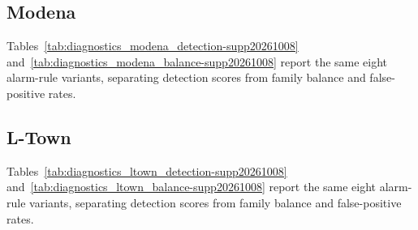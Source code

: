 \clearpage
\subsection{Modena}

Tables~\ref{tab:diagnostics_modena_detection-supp20261008} and~\ref{tab:diagnostics_modena_balance-supp20261008} report the same eight alarm-rule variants, separating detection scores from family balance and false-positive rates.





\clearpage
\subsection{L-Town}

Tables~\ref{tab:diagnostics_ltown_detection-supp20261008} and~\ref{tab:diagnostics_ltown_balance-supp20261008} report the same eight alarm-rule variants, separating detection scores from family balance and false-positive rates.




